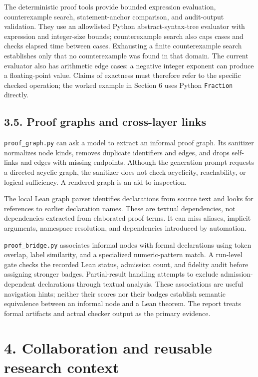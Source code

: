 \documentclass[11pt,a4paper]{article}
\begin{document}
The deterministic proof tools provide bounded expression evaluation, counterexample search, statement-anchor comparison, and audit-output validation. They use an allowlisted Python abstract-syntax-tree evaluator with expression and integer-size bounds; counterexample search also caps cases and checks elapsed time between cases. Exhausting a finite counterexample search establishes only that no counterexample was found in that domain. The current evaluator also has arithmetic edge cases: a negative integer exponent can produce a floating-point value. Claims of exactness must therefore refer to the specific checked operation; the worked example in Section 6 uses Python \nolinkurl{Fraction} directly.

\subsection*{3.5. Proof graphs and cross-layer links}

\nolinkurl{proof_graph.py} can ask a model to extract an informal proof graph. Its sanitizer normalizes node kinds, removes duplicate identifiers and edges, and drops self-links and edges with missing endpoints. Although the generation prompt requests a directed acyclic graph, the sanitizer does not check acyclicity, reachability, or logical sufficiency. A rendered graph is an aid to inspection.

The local Lean graph parser identifies declarations from source text and looks for references to earlier declaration names. These are textual dependencies, not dependencies extracted from elaborated proof terms. It can miss aliases, implicit arguments, namespace resolution, and dependencies introduced by automation.

\nolinkurl{proof_bridge.py} associates informal nodes with formal declarations using token overlap, label similarity, and a specialized numeric-pattern match. A run-level gate checks the recorded Lean status, admission count, and fidelity audit before assigning stronger badges. Partial-result handling attempts to exclude admission-dependent declarations through textual analysis. These associations are useful navigation hints; neither their scores nor their badges establish semantic equivalence between an informal node and a Lean theorem. The report treats formal artifacts and actual checker output as the primary evidence.

\section*{4. Collaboration and reusable research context}
\end{document}

